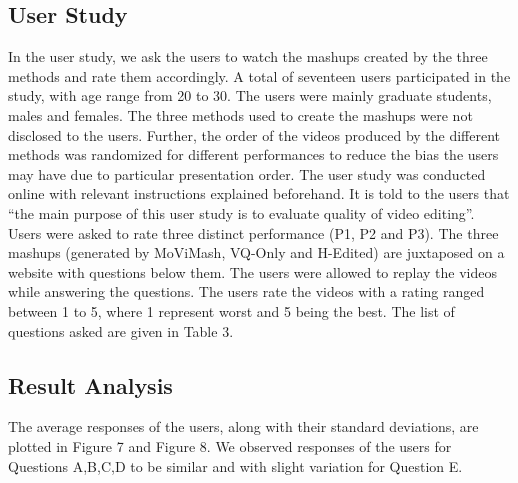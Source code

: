 \documentclass{sig-alternate}
\begin{document}
    \subsection{User Study}
    In the user study, we ask the users to watch the mashups created by the three methods and rate them accordingly. A total of seventeen users participated in the study, with age range from 20 to 30.
    The users were mainly graduate students, males and females. The three methods used to create the mashups were not disclosed to the users. Further, the order of the videos produced by the different methods was randomized for different performances to reduce the bias the users may have due to particular presentation order. The user study was conducted online with relevant instructions explained beforehand. It is told to the users that “the main purpose of this user study is to evaluate quality of video editing”. Users were asked to rate three distinct performance (P1, P2 and P3). The three mashups (generated by MoViMash, VQ-Only and H-Edited) are juxtaposed on a website with questions below them. The users were allowed to replay the videos while answering the questions. The users rate the videos with a rating ranged between 1 to 5, where 1 represent worst and 5 being the best. The list of questions asked are given in Table 3.
    \subsection{Result Analysis}
    The average responses of the users, along with their standard deviations, are plotted in Figure 7 and Figure 8. We observed responses of the users for Questions A,B,C,D to be similar and with slight variation for Question E.
    
\end{document}
